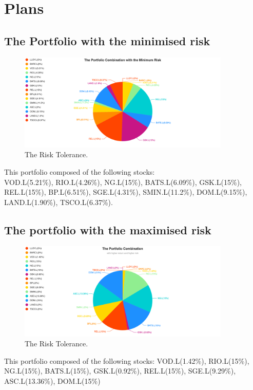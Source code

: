 

\section{Plans}

\subsection{The Portfolio with the minimised risk}

\begin{figure}[!h]
\centering
\includegraphics[width=0.9\textwidth]{minimum risk.png}
\caption{The Risk Tolerance.}
\end{figure}

This portfolio composed of the following stocks: \\


VOD.L(5.21\%), RIO.L(4.26\%), NG.L(15\%), BATS.L(6.09\%), GSK.L(15\%),	REL.L(15\%), BP.L(6.51\%),
SGE.L(4.31\%), SMIN.L(11.2\%), DOM.L(9.15\%), LAND.L(1.90\%), TSCO.L(6.37\%).

\newpage
    
\subsection{The portfolio with the maximised risk}
    
\begin{figure}[!h]
\centering
\includegraphics[width=0.9\textwidth]{higher risk.png}
\caption{The Risk Tolerance.}
\end{figure}
    
This portfolio composed of the following stocks: 
VOD.L(1.42\%), RIO.L(15\%), NG.L(15\%), BATS.L(15\%), GSK.L(0.92\%),	REL.L(15\%), SGE.L(9.29\%), ASC.L(13.36\%), DOM.L(15\%)

\newpage